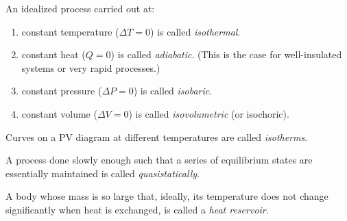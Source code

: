 \begin{definition}
    An idealized process carried out at:
    \begin{enumerate}
        \item constant temperature ($\Delta T = 0$) is called \emph{isothermal}.
        \item constant heat ($Q = 0$) is called \emph{adiabatic}. (This is the case for well-insulated systems or very rapid processes.)
        \item constant pressure ($\Delta P = 0$) is called \emph{isobaric}.
        \item constant volume ($\Delta V = 0$) is called \emph{isovolumetric} (or isochoric).
    \end{enumerate}
\end{definition}
\begin{definition}[Isotherms]
    Curves on a PV diagram at different temperatures are called \emph{isotherms}.
\end{definition}
\begin{definition}[Quasistatically]
    A process done slowly enough such that a series of equilibrium states are essentially maintained is called \emph{quasistatically}.
\end{definition}
\begin{definition}
    A body whose mass is so large that, ideally, its temperature does not change significantly when heat is exchanged, is called a \emph{heat reservoir}.
\end{definition}
